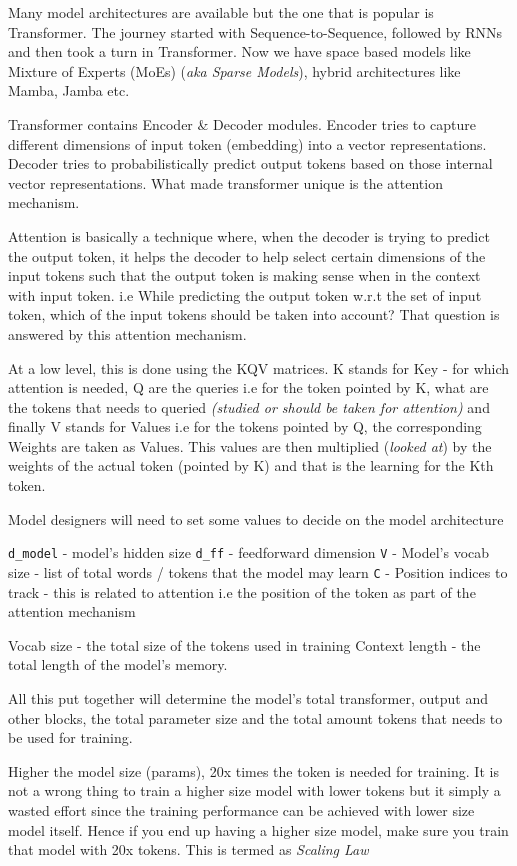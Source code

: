 \documentclass[
  letterpaper,
  DIV=11,
  numbers=noendperiod]{scrreprt}
\begin{document}
Many model architectures are available but the one that is popular is
Transformer. The journey started with Sequence-to-Sequence, followed by
RNNs and then took a turn in Transformer. Now we have space based models
like Mixture of Experts (MoEs) (\emph{aka Sparse Models}), hybrid
architectures like Mamba, Jamba etc.

Transformer contains Encoder \& Decoder modules. Encoder tries to
capture different dimensions of input token (embedding) into a vector
representations. Decoder tries to probabilistically predict output
tokens based on those internal vector representations. What made
transformer unique is the attention mechanism.

Attention is basically a technique where, when the decoder is trying to
predict the output token, it helps the decoder to help select certain
dimensions of the input tokens such that the output token is making
sense when in the context with input token. i.e While predicting the
output token w.r.t the set of input token, which of the input tokens
should be taken into account? That question is answered by this
attention mechanism.

At a low level, this is done using the KQV matrices. K stands for Key -
for which attention is needed, Q are the queries i.e for the token
pointed by K, what are the tokens that needs to queried \emph{(studied
or should be taken for attention)} and finally V stands for Values i.e
for the tokens pointed by Q, the corresponding Weights are taken as
Values. This values are then multiplied (\emph{looked at}) by the
weights of the actual token (pointed by K) and that is the learning for
the Kth token.

Model designers will need to set some values to decide on the model
architecture

\texttt{d\_model} - model's hidden size \texttt{d\_ff} - feedforward
dimension \texttt{V} - Model's vocab size - list of total words / tokens
that the model may learn \texttt{C} - Position indices to track - this
is related to attention i.e the position of the token as part of the
attention mechanism

Vocab size - the total size of the tokens used in training Context
length - the total length of the model's memory.

All this put together will determine the model's total transformer,
output and other blocks, the total parameter size and the total amount
tokens that needs to be used for training.

Higher the model size (params), 20x times the token is needed for
training. It is not a wrong thing to train a higher size model with
lower tokens but it simply a wasted effort since the training
performance can be achieved with lower size model itself. Hence if you
end up having a higher size model, make sure you train that model with
20x tokens. This is termed as \emph{Scaling Law}
\end{document}
